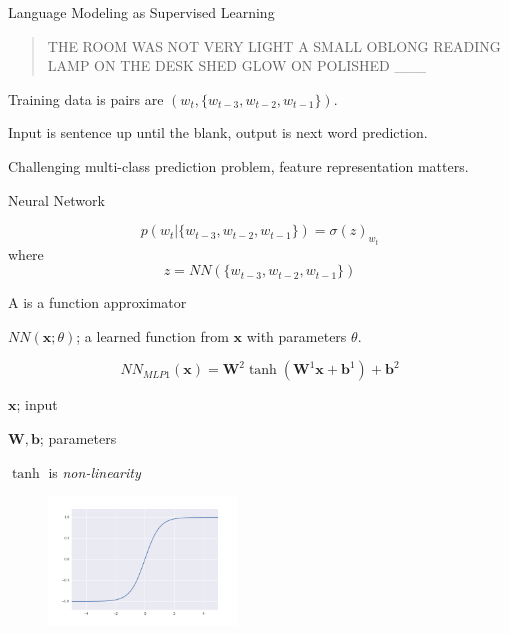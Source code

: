 \documentclass{beamer}
\let\tempone\itemize
\let\temptwo\enditemize
\newcommand{\din}{{d_{\mathrm{in}}}}
\newcommand{\dhid}{{d_{\mathrm{hid}}}}
\newcommand{\dout}{{d_{\mathrm{out}}}}
\renewenvironment{itemize}{\tempone\addtolength{\itemsep}{0.5\baselineskip}}{\temptwo}
\newcommand{\boldx}{\mathbf{x}}
\newcommand{\boldb}{\mathbf{b}}
\newcommand{\boldW}{\mathbf{W}}
\newcommand{\reals}{\ensuremath{\mathbb{R}}}
\begin{document}
\begin{frame}{Language Modeling as Supervised Learning}
  \begin{quote}
    THE ROOM WAS NOT VERY LIGHT A SMALL OBLONG READING LAMP ON THE
    DESK SHED GLOW ON POLISHED \_\_\_\
  \end{quote}


  \begin{itemize}
  \item Training data is pairs are $(w_t, \{w_{t-3}, w_{t-2}, w_{t-1}\})$.

  \item Input is sentence up until the blank, output is next word
    prediction.
  \item Challenging multi-class prediction problem, feature representation matters.

    \pause
    Neural Network 

    \[ p(w_t | \{w_{t-3}, w_{t-2}, w_{t-1}\} ) = \sigma(z)_{w_t} \]
    where 
    \[z = NN(\{w_{t-3}, w_{t-2}, w_{t-1}\}) \]
  \end{itemize}
\end{frame}

\begin{frame}
  A  is a \alert{function approximator}

  
  \begin{itemize}
  \item  $NN(\boldx; \theta)$; a learned function from $\boldx$ with parameters $\theta$.
  \end{itemize}


  \[NN_{MLP1}(\boldx) =  \boldW^2 \tanh(\boldW^1 \boldx + \boldb^1) + \boldb^2\]
  \begin{itemize}
  \item $\boldx$; input

  \item $\boldW, \boldb$; parameters
  \item $\tanh$ is \textit{non-linearity} 
  \end{itemize}
  \begin{figure}
    \centering
    \includegraphics[width=5cm]{tanh}     
  \end{figure}

\end{frame}
\end{document}

